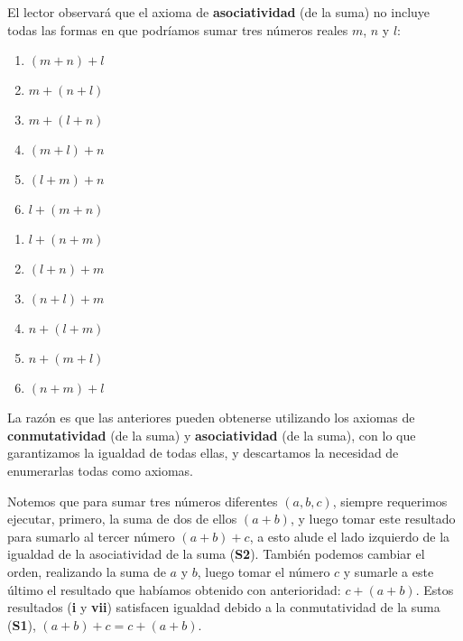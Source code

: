 \documentclass[11pt]{article}
\begin{document}
El lector observará que el axioma de \textbf{asociatividad} (de la suma) no incluye todas las formas en que podríamos sumar tres números reales $m$, $n$ y $l$:

\begin{adjustbox}{minipage=0.5\linewidth,margin=0pt \smallskipamount,center}
    \noindent\begin{minipage}[c]{.5\linewidth}
    \begin{enumerate}[label=\roman*.]
        \item $(m+n)+l$
        \item $m+(n+l)$
        \item $m+(l+n)$
        \item $(m+l)+n$
        \item $(l+m)+n$
        \item $l+(m+n)$
    \end{enumerate}
    \end{minipage}%
\begin{minipage}[c]{.5\linewidth}
    \begin{enumerate}[start=7,label=\roman*.]
        \item $l+(n+m)$
        \item $(l+n)+m$
        \item $(n+l)+m$
        \item $n+(l+m)$
        \item $n+(m+l)$
        \item $(n+m)+l$
    \end{enumerate}
\end{minipage}
\end{adjustbox}

La razón es que las anteriores pueden obtenerse utilizando los axiomas de \textbf{conmutatividad} (de la suma) y \textbf{asociatividad} (de la suma), con lo que garantizamos la igualdad de todas ellas, y descartamos la necesidad de enumerarlas todas como axiomas.

Notemos que para sumar tres números diferentes $(a,b,c)$, siempre requerimos ejecutar, primero, la suma de dos de ellos $(a+b)$, y luego tomar este resultado para sumarlo al tercer número $(a+b)+c$, a esto alude el lado izquierdo de la igualdad de la asociatividad de la suma (\textbf{S2}). También podemos cambiar el orden, realizando la suma de $a$ y $b$, luego tomar el número $c$ y sumarle a este último el resultado que habíamos obtenido con anterioridad: $c+(a+b)$. Estos resultados (\textbf{i} y \textbf{vii}) satisfacen igualdad debido a la conmutatividad de la suma (\textbf{S1}), $(a+b)+c=c+(a+b)$.
\end{document}

